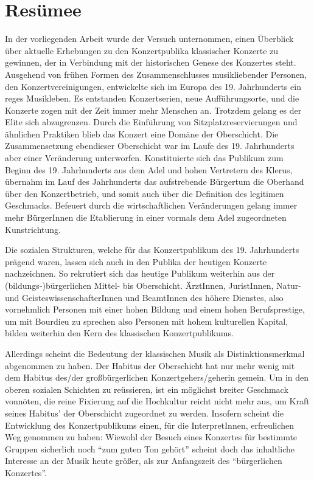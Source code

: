 \documentclass[a4paper, german, oneside]{scrbook}
\begin{document}
\chapter{Resümee}
In der vorliegenden Arbeit wurde der Versuch unternommen, einen Überblick über aktuelle Erhebungen zu den Konzertpublika klassischer Konzerte zu gewinnen, der in Verbindung mit der historischen Genese des Konzertes steht. Ausgehend von frühen Formen des Zusammenschlusses musikliebender Personen, den Konzertvereinigungen, entwickelte sich im Europa des 19. Jahrhunderts ein reges Musikleben. Es entstanden Konzertserien, neue Aufführungsorte, und die Konzerte zogen mit der Zeit immer mehr Menschen an. Trotzdem gelang es der Elite sich abzugrenzen. Durch die Einführung von Sitzplatzreservierungen und ähnlichen Praktiken blieb das Konzert eine Domäne der Oberschicht. Die Zusammensetzung ebendieser Oberschicht war im Laufe des 19. Jahrhunderts aber einer Veränderung unterworfen. Konstituierte sich das Publikum zum Beginn des 19. Jahrhunderts aus dem Adel und hohen Vertretern des Klerus, übernahm im Lauf des Jahrhunderts das aufstrebende Bürgertum die Oberhand über den Konzertbetrieb, und somit auch über die Definition des legitimen Geschmacks. Befeuert durch die wirtschaftlichen Veränderungen gelang immer mehr BürgerInnen die Etablierung in einer vormals dem Adel zugeordneten Kunstrichtung.

Die sozialen Strukturen, welche für das Konzertpublikum des 19. Jahrhunderts prägend waren, lassen sich auch in den Publika der heutigen Konzerte nachzeichnen. So rekrutiert sich das heutige Publikum weiterhin aus der (bildungs-)bürgerlichen Mittel- bis Oberschicht. ÄrztInnen, JuristInnen, Natur-und GeisteswissenschafterInnen und BeamtInnen des höhere Dienstes, also vornehmlich Personen mit einer hohen Bildung und einem hohen Berufsprestige, um mit Bourdieu zu sprechen also Personen mit hohem kulturellen Kapital, bilden weiterhin den Kern des klassischen Konzertpublikums.

Allerdings scheint die Bedeutung der klassischen Musik als Distinktionsmerkmal abgenommen zu haben. Der Habitus der Oberschicht hat nur mehr wenig mit dem Habitus des/der großbürgerlichen Konzertgehers/geherin gemein. Um in den oberen sozialen Schichten zu reüssieren, ist ein möglichst breiter Geschmack vonnöten, die reine Fixierung auf die Hochkultur reicht nicht mehr aus, um Kraft seines Habitus' der Oberschicht zugeordnet zu werden. Insofern scheint die Entwicklung des Konzertpublikums einen, für die InterpretInnen, erfreulichen Weg genommen zu haben: Wiewohl der Besuch eines Konzertes für bestimmte Gruppen sicherlich noch \enquote{zum guten Ton gehört} scheint doch das inhaltliche Interesse an der Musik heute größer, als zur Anfangszeit des \enquote{bürgerlichen Konzertes}.



\printbibliography[filter=LV]
\printbibliography[heading=IQ, filter=IQ]
\end{document}
